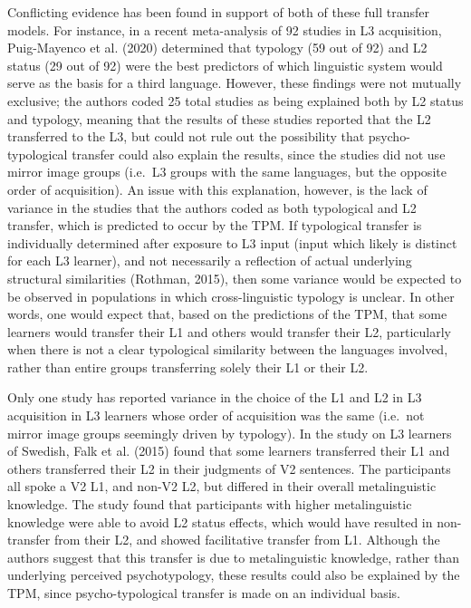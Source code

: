 \documentclass[
  english,
  man]{apa6}
\begin{document}
Conflicting evidence has been found in support of both of these full transfer models.
For instance, in a recent meta-analysis of 92 studies in L3 acquisition, Puig-Mayenco et al. (2020) determined that typology (59 out of 92) and L2 status (29 out of 92) were the best predictors of which linguistic system would serve as the basis for a third language.
However, these findings were not mutually exclusive; the authors coded 25 total studies as being explained both by L2 status and typology, meaning that the results of these studies reported that the L2 transferred to the L3, but could not rule out the possibility that psycho-typological transfer could also explain the results, since the studies did not use mirror image groups (i.e.~L3 groups with the same languages, but the opposite order of acquisition).
An issue with this explanation, however, is the lack of variance in the studies that the authors coded as both typological and L2 transfer, which is predicted to occur by the TPM.
If typological transfer is individually determined after exposure to L3 input (input which likely is distinct for each L3 learner), and not necessarily a reflection of actual underlying structural similarities (Rothman, 2015), then some variance would be expected to be observed in populations in which cross-linguistic typology is unclear.
In other words, one would expect that, based on the predictions of the TPM, that some learners would transfer their L1 and others would transfer their L2, particularly when there is not a clear typological similarity between the languages involved, rather than entire groups transferring solely their L1 or their L2.

Only one study has reported variance in the choice of the L1 and L2 in L3 acquisition in L3 learners whose order of acquisition was the same (i.e.~not mirror image groups seemingly driven by typology).
In the study on L3 learners of Swedish, Falk et al. (2015) found that some learners transferred their L1 and others transferred their L2 in their judgments of V2 sentences. The participants all spoke a V2 L1, and non-V2 L2, but differed in their overall metalinguistic knowledge.
The study found that participants with higher metalinguistic knowledge were able to avoid L2 status effects, which would have resulted in non-transfer from their L2, and showed facilitative transfer from L1. Although the authors suggest that this transfer is due to metalinguistic knowledge, rather than underlying perceived psychotypology, these results could also be explained by the TPM, since psycho-typological transfer is made on an individual basis.
\end{document}
